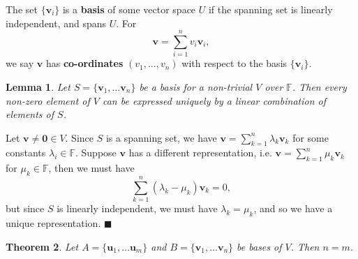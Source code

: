 \documentclass[letter-paper]{tufte-book}
\newtheorem{theorem}{\color{pastel-blue}Theorem}[section]
\newtheorem{lemma}[theorem]{\color{pastel-blue}Lemma}
\newenvironment{proof}[1][Proof]{\begin{trivlist}
\item[\hskip \labelsep {\bfseries #1}]}{\end{trivlist}}
\newcommand{\ub}{{\boldsymbol{u}}}
\newcommand{\vb}{{\boldsymbol{v}}}
\newcommand{\qed}{\hfill$\blacksquare$}
\begin{document}
The set $\{\vb_i\}$ is a \textbf{basis} of some vector space $U$ if the spanning
set is linearly independent, and spans $U$. For
\begin{equation}
  \vb = \sum_{i=1}^n v_i \vb_i,
\end{equation}
we say $\vb$ has \textbf{co-ordinates} $(v_1, \ldots, v_n)$ with respect to the
basis $\{\vb_i\}$.

\begin{lemma}
  Let $S = \{\vb_1, \ldots \vb_n\}$ be a basis for a non-trivial $V$ over
  $\mathbb{F}$. Then every non-zero element of $V$ can be expressed
  \emph{uniquely} by a linear combination of elements of $S$.
\end{lemma}

\begin{proof}
  Let $\vb \neq \boldsymbol{0} \in V$. Since $S$ is a spanning set, we have $\vb
  = \sum_{k=1}^n \lambda_k \vb_k$ for some constants $\lambda_i \in \mathbb{F}$.
  Suppose $\vb$ has a different representation, i.e. $\vb = \sum_{k=1}^n \mu_k
  \vb_k$ for $\mu_k \in \mathbb{F}$, then we must have
  \begin{equation*}
    \sum_{k=1}^n (\lambda_k - \mu_k)\vb_k = 0,
  \end{equation*}
  but since $S$ is linearly independent, we must have $\lambda_k = \mu_k$, and
  so we have a unique representation. \qed
\end{proof}

\begin{theorem}
  Let $A = \{\ub_1, \ldots \ub_m\}$ and $B = \{\vb_1, \ldots \vb_n\}$ be bases of
  $V$. Then $n=m$.
\end{theorem}
\end{document}
